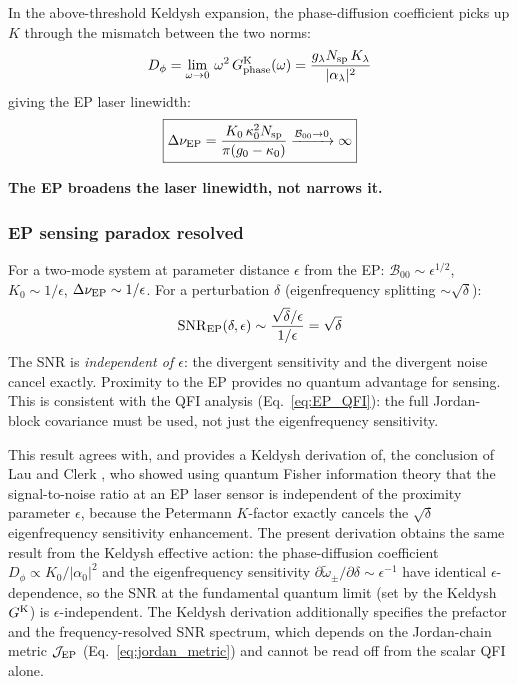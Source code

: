 \documentclass[12pt]{article}
\newcommand{\Keldysh}{{\rm K}}
\newcommand{\EP}{{\rm EP}}
\newcommand{\tomega}{\tilde{\omega}}
\begin{document}
In the above-threshold Keldysh expansion, the phase-diffusion
coefficient picks up $K$ through the mismatch between the two norms:
\begin{equation}
  D_\phi = \lim_{\omega\to 0}\,\omega^2\,G^\Keldysh_{\rm phase}(\omega)
  = \frac{g_\lambda N_{\rm sp}\,K_\lambda}{|\alpha_\lambda|^2}
  \label{eq:Dphi_K}
\end{equation}
giving the EP laser linewidth:
\begin{equation}
  \boxed{
  \Delta\nu_{\rm EP} = \frac{K_0\,\kappa_0^2 N_{\rm sp}}
  {\pi(g_0-\kappa_0)}
  \xrightarrow{\mathcal{B}_{00}\to 0}\infty
  }
  \label{eq:EP_linewidth}
\end{equation}

\textbf{The EP broadens the laser linewidth, not narrows it.}

\subsubsection*{EP sensing paradox resolved}

For a two-mode system at parameter distance $\epsilon$ from the EP:
$\mathcal{B}_{00}\sim\epsilon^{1/2}$, $K_0\sim 1/\epsilon$,
$\Delta\nu_{\rm EP}\sim 1/\epsilon$.  For a perturbation $\delta$
(eigenfrequency splitting $\sim\sqrt{\delta}$):
\begin{equation}
  \mathrm{SNR}_{\rm EP}(\delta,\epsilon)
  \sim \frac{\sqrt{\delta}/\epsilon}{1/\epsilon} = \sqrt{\delta}
  \label{eq:SNR_EP}
\end{equation}
The SNR is \emph{independent of $\epsilon$}: the divergent sensitivity
and the divergent noise cancel exactly.  Proximity to the EP provides
no quantum advantage for sensing.  This is consistent with the QFI
analysis (Eq.~\ref{eq:EP_QFI}): the full Jordan-block covariance must
be used, not just the eigenfrequency sensitivity.

\begin{remark}
This result agrees with, and provides a Keldysh derivation of, the
conclusion of Lau and Clerk \cite{Lau2018}, who showed using quantum
Fisher information theory that the signal-to-noise ratio at an EP laser
sensor is independent of the proximity parameter $\epsilon$, because
the Petermann $K$-factor exactly cancels the $\sqrt{\delta}$
eigenfrequency sensitivity enhancement.  The present derivation obtains
the same result from the Keldysh effective action: the phase-diffusion
coefficient $D_\phi\propto K_0/|\alpha_0|^2$ and the eigenfrequency
sensitivity $\partial\tomega_\pm/\partial\delta\sim\epsilon^{-1}$
have identical $\epsilon$-dependence, so the SNR at the fundamental
quantum limit (set by the Keldysh $G^\Keldysh$) is $\epsilon$-independent.
The Keldysh derivation additionally specifies the prefactor and the
frequency-resolved SNR spectrum, which depends on the Jordan-chain
metric $\mathcal{J}_\EP$ (Eq.~\ref{eq:jordan_metric}) and cannot be
read off from the scalar QFI alone.
\end{remark}
\end{document}
